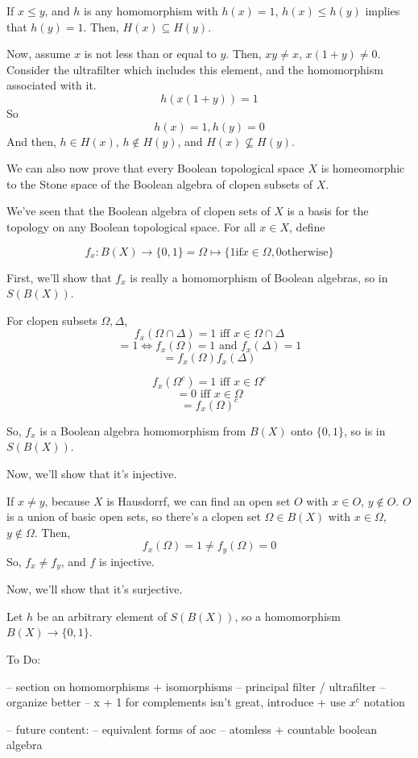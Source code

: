 \documentclass{article}
\begin{document}
      If $x \leq y$, and $h$ is any homomorphism with $h(x) = 1$, $h(x) \leq
      h(y)$ implies that $h(y) = 1$. Then, $H(x) \subseteq H(y)$.

      Now, assume $x$ is not less than or equal to $y$. Then, $xy \neq x$,
      $x(1+y) \neq 0$. Consider the ultrafilter which includes this element, and
      the homomorphism associated with it.
      \[h(x(1+y)) = 1\]
      So
      \[h(x) = 1, h(y) = 0\]
      And then, $h \in H(x)$, $h \notin  H(y)$, and $H(x) \nsubseteq H(y)$.


      We can also now prove that every Boolean topological space $X$ is
      homeomorphic to the Stone space of the Boolean algebra of clopen subsets of
      $X$.

      We've seen that the Boolean algebra of clopen sets of $X$ is a basis for
      the topology on any Boolean topological space. For all $x \in X$, define

      \[f_x: B(X) \rightarrow \{0,1\} = \Omega \mapsto \{1 \text {if} x \in
      \Omega, 0 \text {otherwise}\}\]

      First, we'll show that $f_x$ is really a homomorphism of Boolean algebras,
      so in $S(B(X))$. 

      For clopen subsets $\Omega, \Delta$,
      \[f_x(\Omega \cap \Delta) = 1 \text{ iff } x \in \Omega \cap \Delta\]
      \[= 1 \iff f_x(\Omega) = 1 \text{ and } f_x(\Delta) = 1\]
      \[= f_x(\Omega)f_x(\Delta)\]

      \[f_x(\Omega^c) = 1 \text{ iff } x \in \Omega^c\]
      \[ = 0 \text{ iff } x \in \Omega\]
      \[ = f_x(\Omega)^c\]

      So, $f_x$ is a Boolean algebra homomorphism from $B(X)$ onto $\{0,1\}$, so
      is in $S(B(X))$.

      Now, we'll show that it's injective.

      If $x \neq y$, because $X$ is Hausdorrf, we can find an open set $O$ with
      $x \in O$, $y \notin O$. $O$ is a union of basic open sets, so there's a
      clopen set $\Omega \in B(X)$ with $x \in \Omega$, $y\notin \Omega$. Then,
      \[f_x(\Omega) = 1 \neq f_y(\Omega) = 0\]
      So, $f_x \neq f_y$, and $f$ is injective.

      Now, we'll show that it's surjective.

      Let $h$ be an arbitrary element of $S(B(X))$, so a homomorphism $B(X)
      \rightarrow \{0,1\}$. 





    To Do:

      -- section on homomorphisms + isomorphisms
      -- principal filter / ultrafilter
      -- organize better
      -- x + 1 for complements isn't great, introduce + use $x^c$ notation

      -- future content:
      -- equivalent forms of aoc
      -- atomless + countable boolean algebra
\end{document}
